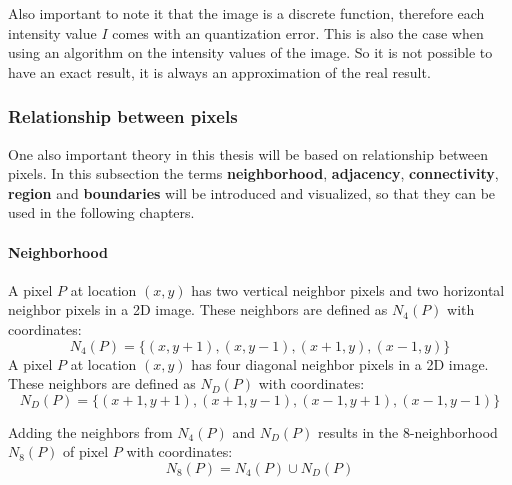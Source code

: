 Also important to note it that the image is a discrete function, therefore each intensity value $I$ comes with an quantization error. This is also the case when using an algorithm on the intensity values of the image. So it is not possible to have an exact result, it is always an approximation of the real result.

\subsubsection{Relationship between pixels}
One also important theory in this thesis will be based on relationship between pixels. In this subsection the terms \textbf{neighborhood}, \textbf{adjacency}, \textbf{connectivity}, \textbf{region} and \textbf{boundaries} will be introduced and visualized, so that they can be used in the following chapters. 

\paragraph{Neighborhood}
A pixel $P$ at location $(x,y)$ has two vertical neighbor pixels and two horizontal neighbor pixels in a 2D image. These neighbors are defined as $N_4(P)$ with coordinates: 
\begin{equation}
        N_4(P) = \{(x,y+1),(x,y-1),(x+1,y),(x-1,y)\}
\end{equation}
A pixel $P$ at location $(x,y)$ has four diagonal neighbor pixels in a 2D image. These neighbors are defined as $N_D(P)$ with coordinates:
\begin{equation}
    N_D(P) = \{(x+1,y+1),(x+1,y-1),(x-1,y+1),(x-1,y-1)\}
\end{equation}

Adding the neighbors from $N_4(P)$ and $N_D(P)$ results in the 8-neighborhood $N_8(P)$ of pixel $P$ with coordinates:
\begin{equation}
    N_8(P) = N_4(P) \cup N_D(P)
\end{equation}


